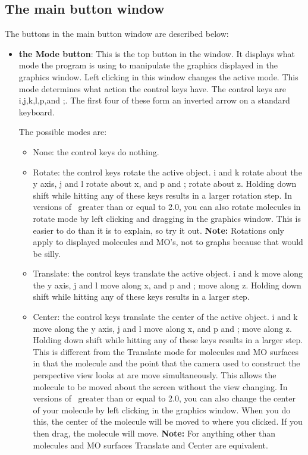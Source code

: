 \subsection{The main button window}

The buttons in the main button window are described below:

\begin{itemize}

\item {\bf the Mode button}:  This is the top button in the window.
It displays what mode the program is using to manipulate the graphics
displayed in the graphics window.  Left clicking in this window
changes the active mode. This mode determines what action
the control keys have.  The control keys are i,j,k,l,p,and ;.  The
first four of these form an inverted arrow on a standard keyboard.  

The possible modes are:

\begin{itemize}
\item None:  the control keys do nothing.

\item Rotate:  the control keys rotate the active object.
i and k rotate about the y axis, j and l rotate about x, and p and ;
rotate about z.  Holding down shift while hitting any of these keys
results in a larger rotation step.  
In versions of \viewprog\ greater than or equal to 2.0, you can also
rotate molecules in rotate mode by left clicking and dragging in the
graphics window.  This is easier to do than it is to explain, so try
it out.
{\bf Note:}  Rotations only apply to displayed molecules and MO's, not
to graphs because that would be silly.


\item Translate:  the control keys translate the active object.
i and k move along the y axis, j and l move along x, and p and ;
move along z.  Holding down shift while hitting any of these keys
results in a larger step.  

\item Center:  the control keys translate the center of the active
object. 
i and k move along the y axis, j and l move along x, and p and ;
move along z.  Holding down shift while hitting any of these keys
results in a larger step. 
This is different from the {\sf Translate} mode for molecules and MO
surfaces in that the molecule and the point that the camera used to
construct the perspective view looks at are move simultaneously.  This
allows the molecule to be moved about the screen without the view
changing. 
In versions of \viewprog\ greater than or equal to 2.0, you can also
change the center of your molecule by left clicking in the graphics
window.  When you do this, the center of the molecule will be moved to
where you clicked.  If you then drag, the molecule will move.
{\bf Note:}  For anything other than molecules and MO surfaces {\sf
Translate} and {\sf Center} are equivalent.


\end{itemize}
\end{itemize}
